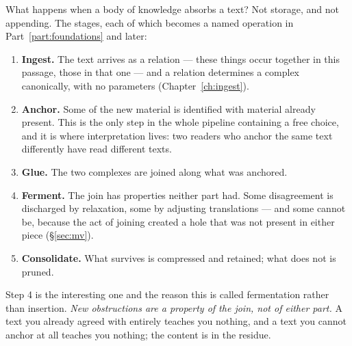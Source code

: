 \begin{intu}\Intu
What happens when a body of knowledge absorbs a text? Not storage, and not
appending. The stages, each of which becomes a named operation in
Part~\ref{part:foundations} and later:

\begin{enumerate}
  \item \textbf{Ingest.} The text arrives as a relation --- these things occur
    together in this passage, those in that one --- and a relation determines a
    complex canonically, with no parameters (Chapter~\ref{ch:ingest}).
  \item \textbf{Anchor.} Some of the new material is identified with material
    already present. This is the only step in the whole pipeline containing a
    free choice, and it is where interpretation lives: two readers who anchor
    the same text differently have read different texts.
  \item \textbf{Glue.} The two complexes are joined along what was anchored.
  \item \textbf{Ferment.} The join has properties neither part had. Some
    disagreement is discharged by relaxation, some by adjusting translations
    --- and some cannot be, because the act of joining created a hole that was
    not present in either piece (\S\ref{sec:mv}).
  \item \textbf{Consolidate.} What survives is compressed and retained; what
    does not is pruned.
\end{enumerate}
Step 4 is the interesting one and the reason this is called fermentation
rather than insertion. \emph{New obstructions are a property of the join,
not of either part.} A text you already agreed with entirely teaches you
nothing, and a text you cannot anchor at all teaches you nothing; the content
is in the residue.
\end{intu}

